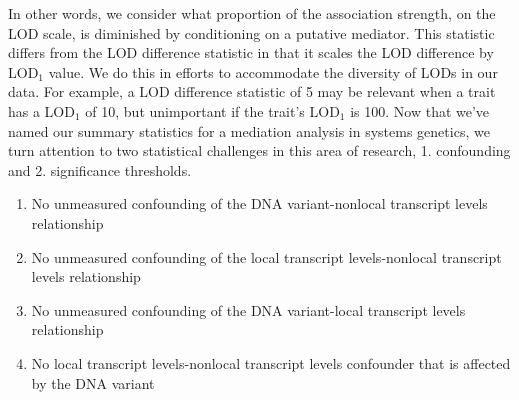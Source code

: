 \documentclass[oneside]{book}\usepackage[]{graphicx}\usepackage[]{color}
\newenvironment{frameenv}[1]
    {\begin{myfloat}[tb]
    \begin{mdframed}[roundcorner=10pt,backgroundcolor=blue!10]
    \caption{#1}
    }
    {%
    \end{mdframed}\end{myfloat}
    }
\begin{document}
In other words, we consider what proportion of the association strength, on the LOD scale, is diminished by conditioning on a putative mediator. 
This statistic differs from the LOD difference statistic in that it scales the LOD difference by LOD$_1$ value. 
We do this in efforts to accommodate the diversity of LODs in our data. 
For example, a LOD difference statistic of 5 may be relevant when 
a trait has a LOD$_1$ of 10, but unimportant if the trait's LOD$_1$ is 100. Now that we've named our summary statistics for a mediation analysis in systems genetics, we turn attention to two statistical challenges in this area of research, 1. confounding and 2. significance thresholds.












\begin{frameenv}{Four assumptions for causal inference}\label{frame1}
  \begin{enumerate}
\item No unmeasured confounding of the DNA variant-nonlocal transcript levels relationship
\item No unmeasured confounding of the local transcript levels-nonlocal transcript levels relationship
\item No unmeasured confounding of the DNA variant-local transcript levels relationship
\item No local transcript levels-nonlocal transcript levels confounder that is affected by the DNA variant
\end{enumerate}

\end{frameenv}
\end{document}
